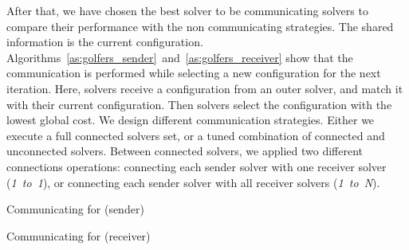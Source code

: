 After that, we have chosen the best solver to be communicating solvers to compare their performance with the non communicating strategies. The shared information is the current configuration. Algorithms~\ref{as:golfers_sender}~and~\ref{as:golfers_receiver} show that the communication is performed while selecting a new configuration for the next iteration. Here, solvers receive a configuration from an outer solver, and match it with their current configuration. Then solvers select the configuration with the lowest global cost. 
We design different communication strategies. Either we execute a full connected solvers set, or a tuned combination of connected and unconnected solvers. Between connected solvers, we applied two different connections operations: connecting each sender solver with one receiver solver ({\it 1~to~1}), or connecting each sender solver with all receiver solvers ({\it 1~to~N}).

\begin{algorithm}
\dontprintsemicolon
\SetNoline
{}
\caption{Communicating \as{} for \SGP{} (sender)}\label{as:golfers_sender}
\end{algorithm}

\begin{algorithm}
\dontprintsemicolon
\SetNoline
{}
\caption{Communicating \as{} for \SGP{} (receiver)}\label{as:golfers_receiver}
\end{algorithm}

